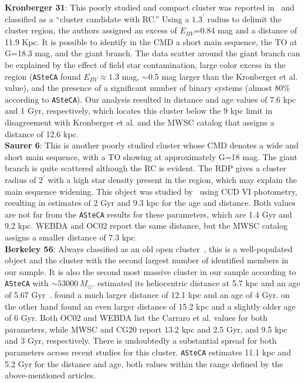 \documentclass{aa}
\begin{document}
\begin{appendix}
  \noindent \textbf{Kronberger 31}: This poorly studied and compact cluster was reported
  in~\cite{Kronberger_2006} and classified as a {``cluster candidate with
  RC.''} Using a $1.3^{\prime}$ radius to delimit the cluster region, the authors
  assigned an excess of $E_{BV}$=0.84 mag and a distance of 11.9 Kpc.
  It is possible to identify in the CMD a short main sequence, the TO at G=18.3
  mag, and the giant branch. The data scatter around the giant branch can be
  explained by the effect of field star contamination, large color excess in the
  region (\texttt{ASteCA} found $E_{BV}\approx1.3$ mag, $\sim$0.5 mag larger
  than the Kronberger et al. value), and the presence of a significant number of binary
  systems (almost 80\% according to \texttt{ASteCA}). Our analysis resulted in
  distance and age values of 7.6 kpc and 1 Gyr, respectively, which
  locates this cluster below the 9 kpc limit in disagreement with Kronberger et
  al. and the MWSC catalog that assigns a distance of 12.6 kpc.\\

  \noindent \textbf{Saurer 6}: This is another poorly studied cluster whose CMD denotes a
  wide and short main sequence, with a TO showing at approximately G=18 mag. The
  giant branch is quite scattered although the RC is evident.
  The RDP gives a cluster radius of $2^{\prime}$ with a high star density
  present in the region, which may explain the main sequence widening.
  This object was studied by~\cite{Frinchaboy_2002} using CCD VI photometry,
  resulting in estimates of 2 Gyr and 9.3 kpc for the age and distance.
  Both values are not far from the  \texttt{ASteCA} results for these parameters,
  which are 1.4 Gyr and 9.2 kpc. WEBDA and OC02 report the same distance, but
  the MWSC catalog assigns a smaller distance of 7.3 kpc.\\

  \noindent \textbf{Berkeley 56}: Always classified as an old open
  cluster~\citep[see, e.g., ][]{King_1964}, this is a well-populated object
  and the cluster with the second largest number of identified members in our
  sample. It is also the second most massive cluster in our sample according
  to \texttt{ASteCA} with $\sim53000\,M_{\odot}$.
  \cite{Janes_1994} estimated its heliocentric distance at 5.7 kpc and an age of
  5.67 Gyr~\citep[according to][]{Salaris_2004}. \cite{Carraro_2006} found a
  much larger distance of 12.1 kpc and an age of 4 Gyr. \cite{Janes_2011} on the
  other hand found an even larger distance of 15.2 kpc and a slightly older age
  of 6 Gyr.
  Both OC02 and WEBDA list the Carraro et al. values for both parameters, while
  MWSC and CG20 report 13.2 kpc and 2.5 Gyr, and 9.5 kpc and 3
  Gyr, respectively. There is undoubtedly a substantial spread for both
  parameters across recent studies for this cluster.
  \texttt{ASteCA} estimates 11.1 kpc and 5.2 Gyr for the distance and age,
  both values within the range defined by the above-mentioned articles.\\


\end{appendix}
\end{document}
